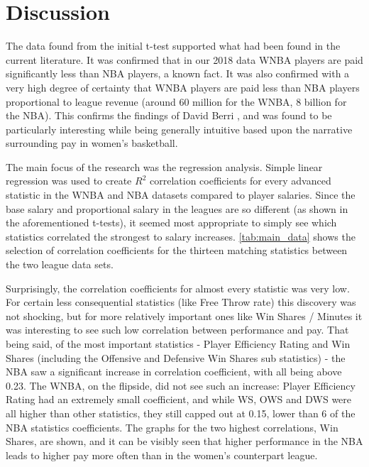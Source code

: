 \documentclass[12pt, titlepage]{article}
\begin{document}
\section{Discussion}
\hspace*{10mm}
The data found from the initial t-test supported what had been found in the current literature. It was confirmed that in our 2018 data WNBA players are 
paid significantly less than NBA players, a known fact. It was also confirmed with a very high degree of certainty that WNBA players are paid less than 
NBA players proportional to league revenue (around 60 million for the WNBA, 8 billion for the NBA). This confirms the findings of David Berri \citep{WNBA_Revenue}, and was found 
to be particularly interesting while being generally intuitive based upon the narrative surrounding pay in women’s basketball.
\par
The main focus of the research was the regression analysis. Simple linear regression was used to create $R^2$ correlation coefficients for every advanced 
statistic in the WNBA and NBA datasets compared to player salaries. Since the base salary and proportional salary in the leagues are so different (as 
shown in the aforementioned t-tests), it seemed most appropriate to simply see which statistics correlated the strongest to salary increases. \ref{tab:main_data} 
shows the selection of correlation coefficients for the thirteen matching statistics between the two league data sets.
\par
Surprisingly, the correlation coefficients for almost every statistic was very low. For certain less consequential statistics (like Free Throw rate) this 
discovery was not shocking, but for more relatively important ones like Win Shares / Minutes it was interesting to see such low correlation between 
performance and pay. That being said, of the most important statistics - Player Efficiency Rating and Win Shares (including the Offensive and Defensive 
Win Shares sub statistics) - the NBA saw a significant increase in correlation coefficient, with all being above 0.23. The WNBA, on the flipside, did not 
see such an increase: Player Efficiency Rating had an extremely small coefficient, and while WS, OWS and DWS were all higher than other statistics, they 
still capped out at 0.15, lower than 6 of the NBA statistics coefficients. The graphs for the two highest correlations, Win Shares, are shown, and it can 
be visibly seen that higher performance in the NBA leads to higher pay more often than in the women’s counterpart league.
\par
\end{document}
